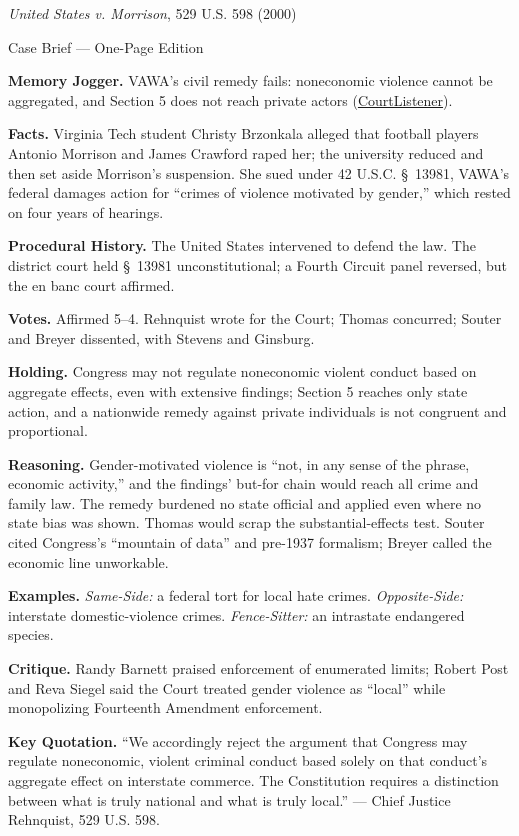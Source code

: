 \documentclass[12pt]{article}
\begin{document}
\begin{center}
{\Large \textit{United States v. Morrison}, 529 U.S. 598 (2000)\par}
\vspace{0.3em}
{\normalsize Case Brief --- One-Page Edition\par}
\end{center}

\textbf{Memory Jogger.} VAWA's civil remedy fails: noneconomic violence cannot be aggregated, and Section 5 does not reach private actors (\href{https://www.courtlistener.com/opinion/118363/united-states-v-morrison/}{CourtListener}).

\textbf{Facts.} Virginia Tech student Christy Brzonkala alleged that football players Antonio Morrison and James Crawford raped her; the university reduced and then set aside Morrison's suspension. She sued under 42 U.S.C. \S~13981, VAWA's federal damages action for ``crimes of violence motivated by gender,'' which rested on four years of hearings.

\textbf{Procedural History.} The United States intervened to defend the law. The district court held \S~13981 unconstitutional; a Fourth Circuit panel reversed, but the en banc court affirmed.

\textbf{Votes.} Affirmed 5--4. Rehnquist wrote for the Court; Thomas concurred; Souter and Breyer dissented, with Stevens and Ginsburg.

\textbf{Holding.} Congress may not regulate noneconomic violent conduct based on aggregate effects, even with extensive findings; Section 5 reaches only state action, and a nationwide remedy against private individuals is not congruent and proportional.

\textbf{Reasoning.} Gender-motivated violence is ``not, in any sense of the phrase, economic activity,'' and the findings' but-for chain would reach all crime and family law. The remedy burdened no state official and applied even where no state bias was shown. Thomas would scrap the substantial-effects test. Souter cited Congress's ``mountain of data'' and pre-1937 formalism; Breyer called the economic line unworkable.

\textbf{Examples.} \emph{Same-Side:} a federal tort for local hate crimes. \emph{Opposite-Side:} interstate domestic-violence crimes. \emph{Fence-Sitter:} an intrastate endangered species.

\textbf{Critique.} Randy Barnett praised enforcement of enumerated limits; Robert Post and Reva Siegel said the Court treated gender violence as ``local'' while monopolizing Fourteenth Amendment enforcement.

\textbf{Key Quotation.} ``We accordingly reject the argument that Congress may regulate noneconomic, violent criminal conduct based solely on that conduct's aggregate effect on interstate commerce. The Constitution requires a distinction between what is truly national and what is truly local.'' --- Chief Justice Rehnquist, 529 U.S. 598.
\end{document}
